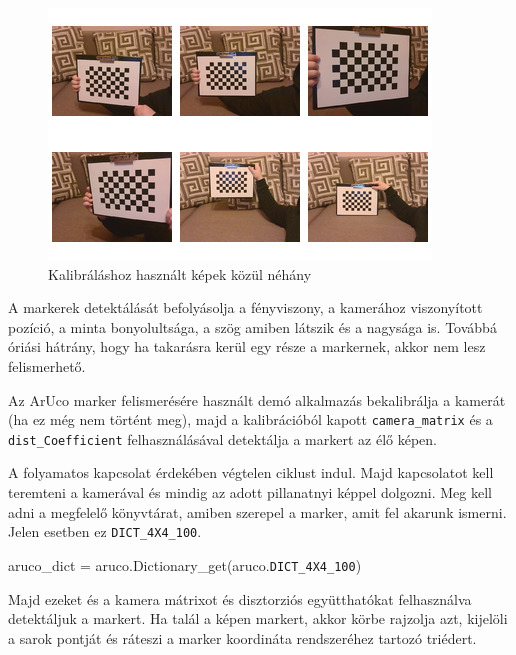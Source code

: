 \begin{figure}[htp]
    \centering
   	\includegraphics[width=7truecm, height=6truecm]{images/calibration.jpg}
	\caption{Kalibráláshoz használt képek közül néhány}
\end{figure}


A markerek detektálását befolyásolja a fényviszony, a kamerához viszonyított pozíció, a minta bonyolultsága, a szög amiben látszik és a nagysága is. Továbbá óriási hátrány, hogy ha takarásra kerül egy része a markernek, akkor nem lesz felismerhető.

Az ArUco marker felismerésére használt demó alkalmazás bekalibrálja a kamerát (ha ez még nem történt meg), majd a kalibrációból kapott \texttt{camera\_matrix} és a \texttt{dist\_Coefficient} felhasználásával detektálja a markert az élő képen.

A folyamatos kapcsolat érdekében végtelen ciklust indul. Majd kapcsolatot kell teremteni a kamerával és mindig az adott pillanatnyi képpel dolgozni. 
Meg kell adni a megfelelő könyvtárat, amiben szerepel a marker, amit fel akarunk ismerni. Jelen esetben ez  \texttt{DICT\_4X4\_100}.\\

\begin{python}
aruco_dict = aruco.Dictionary_get(aruco.\texttt{DICT\_4X4\_100})
\end{python}


Majd ezeket és a kamera mátrixot és disztorziós együtthatókat felhasználva detektáljuk a markert.
Ha talál a képen markert, akkor körbe rajzolja azt, kijelöli a sarok pontját és ráteszi a marker koordináta rendszeréhez tartozó triédert.\\

